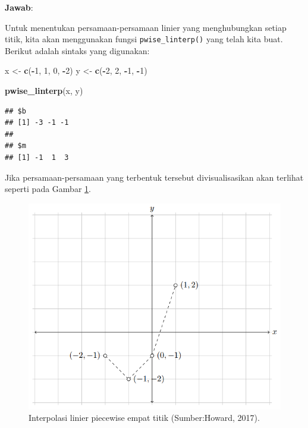 \documentclass[
]{book}
\newenvironment{Shaded}{\begin{snugshade}}{\end{snugshade}}
\newcommand{\DecValTok}[1]{\textcolor[rgb]{0.00,0.00,0.81}{#1}}
\newcommand{\FunctionTok}[1]{\textcolor[rgb]{0.13,0.29,0.53}{\textbf{#1}}}
\newcommand{\NormalTok}[1]{#1}
\newcommand{\OtherTok}[1]{\textcolor[rgb]{0.56,0.35,0.01}{#1}}
\newcommand{\SpecialCharTok}[1]{\textcolor[rgb]{0.81,0.36,0.00}{\textbf{#1}}}
\theoremstyle{definition}
\theoremstyle{definition}
\theoremstyle{definition}
\theoremstyle{definition}
\theoremstyle{remark}
\begin{document}
\textbf{Jawab}:

Untuk menentukan persamaan-persamaan linier yang menghubungkan setiap titik, kita akan menggunakan fungsi \texttt{pwise\_linterp()} yang telah kita buat. Berikut adalah sintaks yang digunakan:

\begin{Shaded}
\begin{Highlighting}[]
\NormalTok{x }\OtherTok{\textless{}{-}} \FunctionTok{c}\NormalTok{(}\SpecialCharTok{{-}}\DecValTok{1}\NormalTok{, }\DecValTok{1}\NormalTok{, }\DecValTok{0}\NormalTok{, }\SpecialCharTok{{-}}\DecValTok{2}\NormalTok{)}
\NormalTok{y }\OtherTok{\textless{}{-}} \FunctionTok{c}\NormalTok{(}\SpecialCharTok{{-}}\DecValTok{2}\NormalTok{, }\DecValTok{2}\NormalTok{, }\SpecialCharTok{{-}}\DecValTok{1}\NormalTok{, }\SpecialCharTok{{-}}\DecValTok{1}\NormalTok{)}

\FunctionTok{pwise\_linterp}\NormalTok{(x, y)}
\end{Highlighting}
\end{Shaded}

\begin{verbatim}
## $b
## [1] -3 -1 -1
## 
## $m
## [1] -1  1  3
\end{verbatim}

Jika persamaan-persamaan yang terbentuk tersebut divisualisasikan akan terlihat seperti pada Gambar \ref{fig:pwiselinviz}.

\begin{figure}

{\centering \includegraphics[width=0.8\linewidth]{./images/pwiselinviz} 

}

\caption{Interpolasi linier piecewise empat titik 
(Sumber:Howard, 2017).}\label{fig:pwiselinviz}
\end{figure}
\end{document}
